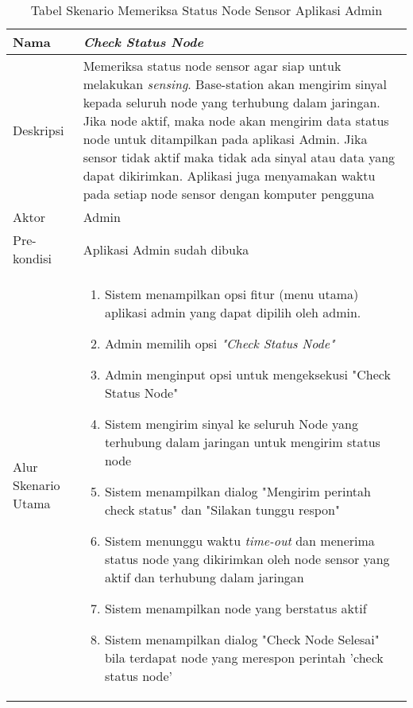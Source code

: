     \begin{table}[H]
        \centering
        \caption{Tabel Skenario Memeriksa Status Node Sensor Aplikasi Admin}
        \begin{tabular}{|p{3cm}|p{10cm}|}
        \hline
            Nama & \textit{Check Status Node}\\
        \hline 
        \hline
            Deskripsi & Memeriksa status node sensor agar siap untuk melakukan \textit{sensing}. Base-station akan mengirim sinyal kepada seluruh node yang terhubung dalam jaringan. Jika node aktif, maka node akan mengirim data status node untuk ditampilkan pada aplikasi Admin. Jika sensor tidak aktif maka tidak ada sinyal atau data yang dapat dikirimkan. Aplikasi juga menyamakan waktu pada setiap node sensor dengan komputer pengguna\\
        \hline
            Aktor & Admin\\
        \hline
            Pre-kondisi & Aplikasi Admin sudah dibuka\\
        \hline
            Alur Skenario Utama & 
             \begin{enumerate}
                \item Sistem menampilkan opsi fitur (menu utama) aplikasi admin yang dapat dipilih oleh admin.
                
                \item Admin memilih opsi \textit{"Check Status Node"}
                
                \item Admin menginput opsi untuk mengeksekusi "Check Status Node"
                
                \item Sistem mengirim sinyal ke seluruh Node yang terhubung dalam jaringan untuk mengirim status node
                
                \item Sistem menampilkan dialog "Mengirim perintah check status" dan "Silakan tunggu respon"
                
                \item Sistem menunggu waktu \textit{time-out} dan menerima status node yang dikirimkan oleh node sensor yang aktif dan terhubung dalam jaringan
                
                \item Sistem menampilkan node yang berstatus aktif
                
                \item Sistem menampilkan dialog "Check Node Selesai" bila terdapat node yang merespon perintah 'check status node'
                

\end{enumerate}
\end{tabular}
\end{table}
